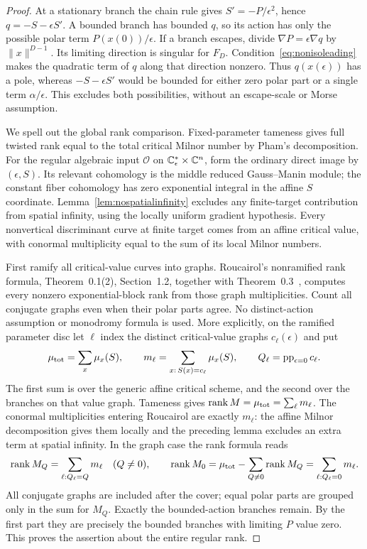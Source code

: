 \begin{proof}
At a stationary branch the chain rule gives
$S'=-P/\epsilon^2$, hence $q=-S-\epsilon S'$.
A bounded branch has bounded $q$, so its action has only the
possible polar term $P(x(0))/\epsilon$. If a branch escapes,
divide $\nabla P=\epsilon\nabla q$ by $\|x\|^{D-1}$.
Its limiting direction is singular for $F_D$.
Condition~\eqref{eq:nonisoleading} makes the quadratic term of
$q$ along that direction nonzero. Thus $q(x(\epsilon))$ has a
pole, whereas $-S-\epsilon S'$ would be bounded for either zero
polar part or a single term $\alpha/\epsilon$. This excludes
both possibilities, without an escape-scale or Morse assumption.

We spell out the global rank comparison. Fixed-parameter tameness
gives full twisted rank equal to the total critical Milnor number
by Pham's decomposition. For the regular algebraic input
$\mathcal O$ on $\mathbb C^*_{\epsilon}\times\mathbb C^n$, form the ordinary
direct image by $(\epsilon,S)$. Its relevant cohomology is the
middle reduced Gauss--Manin module; the constant fiber cohomology
has zero exponential integral in the affine $S$ coordinate.
Lemma~\ref{lem:nospatialinfinity} excludes any finite-target
contribution from spatial infinity, using the locally uniform gradient
hypothesis. Every nonvertical discriminant curve at finite target comes
from an affine critical value, with conormal multiplicity equal
to the sum of its local Milnor numbers.

First ramify all critical-value curves into graphs. Roucairol's
nonramified rank formula, Theorem~0.1(2), Section~1.2, together
with Theorem~0.3~\cite{RoucairolFormal}, computes every nonzero
exponential-block rank from those graph multiplicities. Count
all conjugate graphs even when their polar parts agree. No
distinct-action assumption or monodromy formula is used.
More explicitly, on the ramified parameter disc let $\ell$ index
the distinct critical-value graphs $c_\ell(\epsilon)$ and put
\[
 \mu_{\rm tot}=\sum_x\mu_x(S),\qquad
 m_\ell=\sum_{x:\,S(x)=c_\ell}\mu_x(S),\qquad
 Q_\ell=\operatorname{pp}_{\epsilon=0}c_\ell.
\]
The first sum is over the generic affine critical scheme, and the
second over the branches on that value graph. Tameness gives
$\operatorname{rank}M=\mu_{\rm tot}=\sum_\ell m_\ell$.
The conormal multiplicities entering Roucairol are exactly $m_\ell$:
the affine Milnor decomposition gives them locally and the preceding
lemma excludes an extra term at spatial infinity. In the graph case
the rank formula reads
\[
 \operatorname{rank}M_Q=\sum_{\ell:Q_\ell=Q}m_\ell\quad(Q\ne0),
 \qquad
 \operatorname{rank}M_0
 =\mu_{\rm tot}-\sum_{Q\ne0}\operatorname{rank}M_Q
 =\sum_{\ell:Q_\ell=0}m_\ell.
\]
All conjugate graphs are included after the cover; equal polar parts
are grouped only in the sum for $M_Q$. Exactly the bounded-action
branches remain. By the first part
they are precisely the bounded branches with limiting $P$ value
zero. This proves the assertion about the entire regular rank.
\end{proof}

